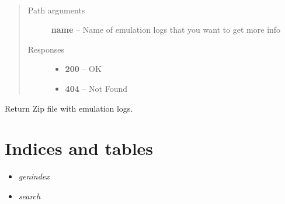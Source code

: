 \documentclass[letterpaper,10pt,english]{sphinxmanual}
\begin{document}
\begin{fulllineitems}
\label{01_how_to_use_it:method-get-logs-name-}~\begin{quote}\begin{description}
\item[{Path arguments}] \leavevmode
\textbf{name} -- Name of emulation logs that you want to get more info

\item[{Responses}] \leavevmode\begin{itemize}
\item {} 
\textbf{200} -- OK

\item {} 
\textbf{404} -- Not Found

\end{itemize}

\end{description}\end{quote}

Return Zip file with emulation logs.

\end{fulllineitems}



\chapter{Indices and tables}
\label{index:indices-and-tables}\begin{itemize}
\item {} 
\emph{genindex}

\item {} 
\emph{search}

\end{itemize}



\renewcommand{\indexname}{Index}
\printindex
\end{document}
